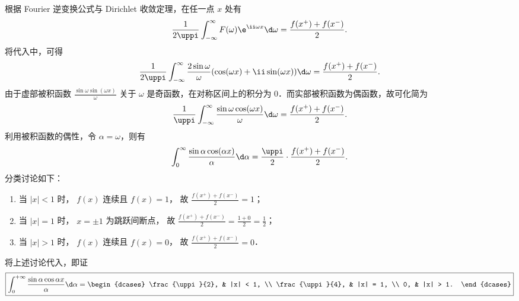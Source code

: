 \begin{solution}
    根据 Fourier 逆变换公式与 Dirichlet 收敛定理，在任一点 $x$ 处有
    \begin{equation}\label{eq:inv-conv-3}
        \frac{1}{2\uppi} \int_{-\infty}^{\infty} F(\omega) \e^{\ii\omega x} \d\omega = \frac{f(x^+) + f(x^-)}{2}.
    \end{equation}
    将代入中，可得
    \begin{equation}\label{eq:sub-4}
        \frac{1}{2\uppi} \int_{-\infty}^{\infty} \frac{2\sin\omega}{\omega} (\cos(\omega x) + \ii\sin(\omega x)) \d\omega = \frac{f(x^+) + f(x^-)}{2}.
    \end{equation}
    由于虚部被积函数 $\frac{\sin\omega \sin(\omega x)}{\omega}$ 关于 $\omega$ 是奇函数，在对称区间上的积分为 $0$．而实部被积函数为偶函数，故可化简为
    \begin{equation}\label{eq:even-int-5}
        \frac{1}{\uppi} \int_{-\infty}^{\infty} \frac{\sin\omega \cos(\omega x)}{\omega} \d\omega = \frac{f(x^+) + f(x^-)}{2}.
    \end{equation}
    利用被积函数的偶性，令 $\alpha = \omega$，则有
    \begin{equation}\label{eq:alpha-int-6}
        \int_0^\infty \frac{\sin\alpha \cos(\alpha x)}{\alpha} \d\alpha = \frac{\uppi}{2} \cdot \frac{f(x^+) + f(x^-)}{2}.
    \end{equation}
    分类讨论如下：
    \begin{enumerate}
        \item 当 $|x| < 1$ 时， $f(x)$ 连续且 $f(x) = 1$， 故 $\frac{f(x^+) + f(x^-)}{2} = 1$；
        \item 当 $|x| = 1$ 时， $x = \pm 1$ 为跳跃间断点， 故 $\frac{f(x^+) + f(x^-)}{2} = \frac{1+0}{2} = \frac{1}{2}$；
        \item 当 $|x| > 1$ 时， $f(x)$ 连续且 $f(x) = 0$， 故 $\frac{f(x^+) + f(x^-)}{2} = 0$．
    \end{enumerate}
    将上述讨论代入，即证
    \begin{equation}
        \boxed{\int_{0}^{+\infty} \frac{\sin \alpha \cos \alpha x}{\alpha} \d\alpha = \begin{dcases} \frac{\uppi}{2}, & |x| < 1, \\ \frac{\uppi}{4}, & |x| = 1, \\ 0, & |x| > 1. \end{dcases}}
    \end{equation}
\end{solution}


